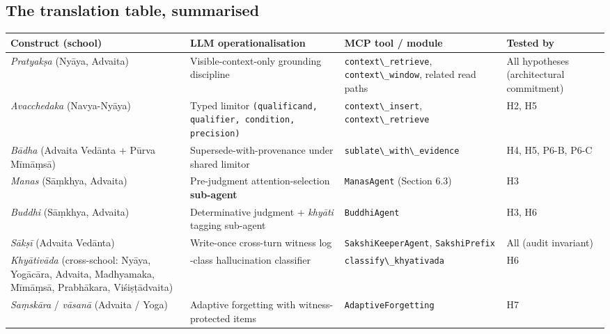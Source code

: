 \subsection{The translation table, summarised}\label{the-translation-table-summarised}

{\def\LTcaptype{none} %
\begin{longtable}[]{@{}
  >{\raggedright\arraybackslash}p{}
  >{\raggedright\arraybackslash}p{}
  >{\raggedright\arraybackslash}p{}
  >{\raggedright\arraybackslash}p{}@{}}
\toprule\noalign{}
\begin{minipage}[b]{\linewidth}\raggedright
Construct (school)
\end{minipage} & \begin{minipage}[b]{\linewidth}\raggedright
LLM operationalisation
\end{minipage} & \begin{minipage}[b]{\linewidth}\raggedright
MCP tool / module
\end{minipage} & \begin{minipage}[b]{\linewidth}\raggedright
Tested by
\end{minipage} \\
\midrule\noalign{}
\endhead
\bottomrule\noalign{}
\endlastfoot
\emph{Pratyakṣa} (Nyāya, Advaita) & Visible-context-only grounding discipline & \passthrough{\lstinline!context\_retrieve!}, \passthrough{\lstinline!context\_window!}, related read paths & All hypotheses (architectural commitment) \\
\emph{Avacchedaka} (Navya-Nyāya) & Typed limitor \passthrough{\lstinline!(qualificand, qualifier, condition, precision)!} & \passthrough{\lstinline!context\_insert!}, \passthrough{\lstinline!context\_retrieve!} & H2, H5 \\
\emph{Bādha} (Advaita Vedānta + Pūrva Mīmāṃsā) & Supersede-with-provenance under shared limitor & \passthrough{\lstinline!sublate\_with\_evidence!} & H4, H5, P6-B, P6-C \\
\emph{Manas} (Sāṃkhya, Advaita) & Pre-judgment attention-selection \textbf{sub-agent} & \passthrough{\lstinline!ManasAgent!} (Section 6.3) & H3 \\
\emph{Buddhi} (Sāṃkhya, Advaita) & Determinative judgment + \emph{khyāti} tagging sub-agent & \passthrough{\lstinline!BuddhiAgent!} & H3, H6 \\
\emph{Sākṣī} (Advaita Vedānta) & Write-once cross-turn witness log & \passthrough{\lstinline!SakshiKeeperAgent!}, \passthrough{\lstinline!SakshiPrefix!} & All (audit invariant) \\
\emph{Khyātivāda} (cross-school: Nyāya, Yogācāra, Advaita, Madhyamaka, Mīmāṃsā, Prabhākara, Viśiṣṭādvaita) & 6-class hallucination classifier & \passthrough{\lstinline!classify\_khyativada!} & H6 \\
\emph{Saṃskāra} / \emph{vāsanā} (Advaita / Yoga) & Adaptive forgetting with witness-protected items & \passthrough{\lstinline!AdaptiveForgetting!} & H7 \\
\end{longtable}
}

